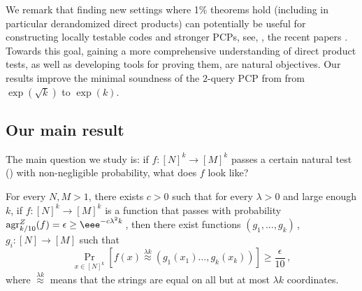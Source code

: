 \documentclass{toc}
\newcommand{\Prob}[2][]{\Pr_{{#1}}\left[#2\right]} %
\newcommand{\Brac}[1]{\left[#1\right]} %
\newcommand\f{f} %
\newcommand\pf{g} %
\newcommand{\test}[2]{
	\ifx &#2&
	\textrm{agr}^{#1}
	\else	
	\textrm{agr}^{#1}_{#2}
	\fi}
\newcommand\neql[1]{\stackrel{{#1}}{ \approx}} %
\begin{document}
We remark that finding new settings where 1\% theorems hold (including in particular derandomized direct products) can
%
potentially be  %
useful for constructing locally testable codes and stronger PCPs, see, \eg, the
%
%
recent papers \cite{KMS,DKKMS}.  %
Towards this goal,  %
gaining a more comprehensive understanding of direct product tests, as well as developing tools for proving them, %
are natural objectives.  %
Our results improve the minimal soundness of the $2$-query PCP from \cite{impagliazzo2012new} from $\exp(\sqrt{k})$ to $\exp(k)$.
\subsection{Our main result}
The main question we study is: if $\f:[N]^k\to[M]^k$ passes a certain natural test () with non-negligible probability, what does $f$ look like?
%
%
%
%

%
\begin{theorem}\label{thm:global}
	For every $N,M>1$, there exists
%
%
$c > 0$ such that for every %
%
%
%
$\lambda>0$ and large enough $k$, if $\f:[N]^k \rightarrow[M]^k$ is a function that passes  with probability  $\test{Z}{k/10}(f) =\epsilon\geq \eee^{-c \lambda^2 k}$\,, then there exist functions $(\pf_1,\ldots, \pf_k)$\,, $\pf_i:[N]\rightarrow[M]$ such that
	\[\Prob[x\in\Brac{N}^k]{\f(x) \neql{\lambda k}( \pf_1(x_1)\ldots, \pf_k(x_k))} \geq \frac{\epsilon}{10}\,,\] %
%
%
where  %
$\neql{\lambda k}$ means that the strings are equal on all but at most $\lambda k$ coordinates.
\end{theorem}
\end{document}
